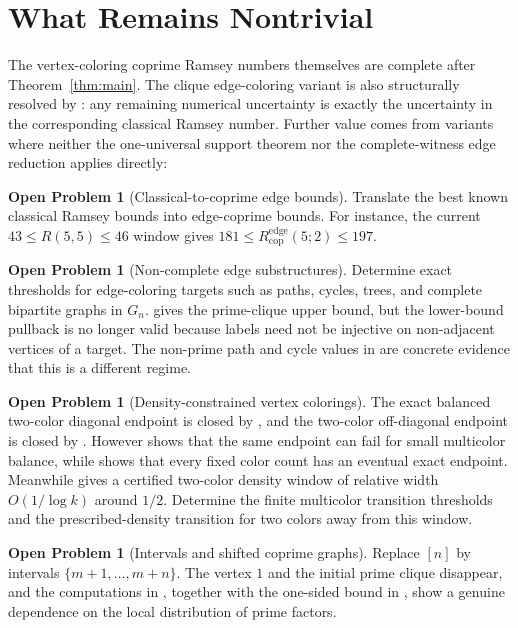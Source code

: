 \documentclass[11pt]{article}
\theoremstyle{plain}
\theoremstyle{definition}
\newtheorem{problem}[theorem]{Open Problem}
\theoremstyle{remark}
\newcommand{\Redge}{R_{\mathrm{cop}}^{\mathrm{edge}}}
\begin{document}
\section{What Remains Nontrivial}

The vertex-coloring coprime Ramsey numbers themselves are complete after
Theorem~\ref{thm:main}.  The clique edge-coloring variant is also
structurally resolved by : any remaining numerical
uncertainty is exactly the uncertainty in the corresponding classical Ramsey
number.  Further value comes from variants where neither the one-universal
support theorem nor the complete-witness edge reduction applies directly:

\begin{problem}[Classical-to-coprime edge bounds]
Translate the best known classical Ramsey bounds into edge-coprime bounds.
For instance, the current $43\le R(5,5)\le 46$ window
\cite{radziszowski2026,angeltveit-mckay2024} gives
$181\le \Redge(5;2)\le 197$.
\end{problem}

\begin{problem}[Non-complete edge substructures]
Determine exact thresholds for edge-coloring targets such as paths, cycles,
trees, and complete bipartite graphs in $G_n$.  
gives the prime-clique upper bound, but the lower-bound pullback is no longer
valid because labels need not be injective on non-adjacent vertices of a
target.  The non-prime path and cycle values in
 are concrete evidence that this is a
different regime.
\end{problem}

\begin{problem}[Density-constrained vertex colorings]
The exact balanced two-color diagonal endpoint is closed by
, and the two-color off-diagonal endpoint is closed
by .  However
 shows that the same endpoint can fail
for small multicolor balance, while
 shows that every fixed color count has
an eventual exact endpoint.  Meanwhile  gives a
certified two-color density window of relative width $O(1/\log k)$ around
$1/2$.  Determine the finite multicolor transition thresholds and the
prescribed-density transition for two colors away from this window.
\end{problem}

\begin{problem}[Intervals and shifted coprime graphs]
Replace $[n]$ by intervals $\{m+1,\ldots,m+n\}$.  The vertex $1$ and the
initial prime clique disappear, and the computations in
, together with the
one-sided bound in , show a genuine dependence on
the local distribution of prime factors.
\end{problem}
\end{document}
